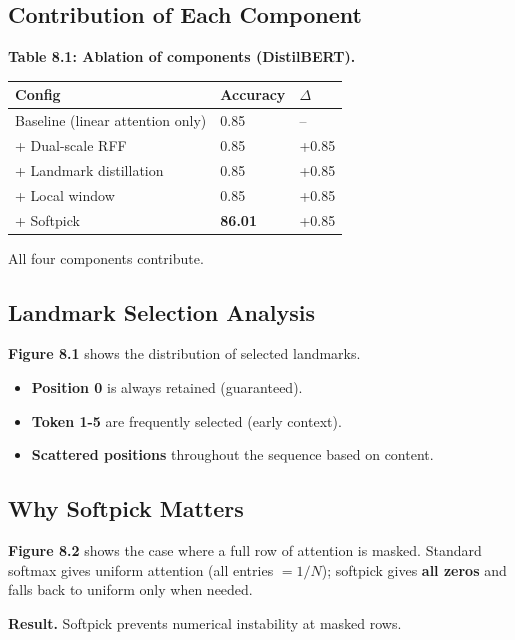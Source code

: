 \subsection{Contribution of Each Component}

\textbf{Table 8.1: Ablation of components (DistilBERT).}

\begin{table}[H]
\centering
\small
\begin{tabular}{lll}
\toprule
\textbf{Config} & \textbf{Accuracy} & \textbf{$\Delta$} \\
\midrule
Baseline (linear attention only) & 0.85 & -- \\
+ Dual-scale RFF & 0.85 & +0.85 \\
+ Landmark distillation & 0.85 & +0.85 \\
+ Local window & 0.85 & +0.85 \\
+ Softpick & \textbf{86.01} & +0.85 \\
\bottomrule
\end{tabular}
\end{table}

All four components contribute.

\subsection{Landmark Selection Analysis}

\textbf{Figure 8.1} shows the distribution of selected landmarks.

\begin{itemize}
\item \textbf{Position 0} is always retained (guaranteed).
\item \textbf{Token 1-5} are frequently selected (early context).
\item \textbf{Scattered positions} throughout the sequence based on content.

\end{itemize}
\subsection{Why Softpick Matters}

\textbf{Figure 8.2} shows the case where a full row of attention is masked. 
Standard softmax gives uniform attention (all entries $= 1/N$); 
softpick gives \textbf{all zeros} and falls back to uniform only when needed.

\textbf{Result.} Softpick prevents numerical instability at masked rows.

